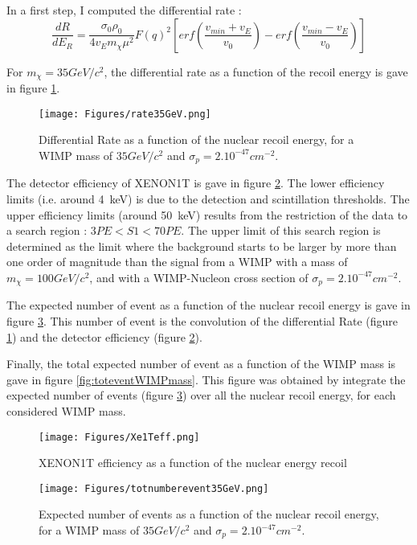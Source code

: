 \documentclass[a4paper, twoside, openany, 11pt]{book}
\begin{document}
In a first step, I computed the differential rate :
\begin{equation}
\frac{dR}{dE_R}= \frac{\sigma_0 \rho_0}{4 v_E m_\chi \mu^2} F(q)^2 \left[erf(\frac{v_{min}+v_E}{v_0})-erf(\frac{v_{min}-v_E}{v_0})\right]
\end{equation}

For $m_\chi = 35 GeV/c^2$, the differential rate as a function of the recoil energy is gave in figure \ref{fig:diffrate35GeV}.

\begin{figure}[h]
	\centering
     \texttt{[image: Figures/rate35GeV.png]}
	\caption{Differential Rate as a function of the nuclear recoil energy, for a WIMP mass of $35 GeV/c^2$ and $\sigma_p =2.10^{-47} cm^{-2}$.}
    \label{fig:diffrate35GeV}
\end{figure}

The detector efficiency of XENON1T is gave in figure \ref{fig:Xe1Teff}. The lower efficiency limits (i.e. around 4~keV) is due to the detection and scintillation thresholds. The upper efficiency limits (around 50~keV) results from the restriction of the data to a search region : $3 PE < S1 < 70 PE$. The upper limit of this search region is determined as the limit where the  background starts to be larger by more than one order of magnitude than the signal from a WIMP with a mass of $m_\chi= 100 GeV/c^2$, and with a WIMP-Nucleon cross section of $\sigma_p = 2.10^{-47} cm^{-2}$.



The expected number of event as a function of the nuclear recoil energy  is gave in figure \ref{fig:totnumberevent35GeV}. This number of event is the convolution of the differential Rate (figure \ref{fig:diffrate35GeV}) and the detector efficiency (figure \ref{fig:Xe1Teff}).


Finally, the total expected number of event as a function of the WIMP mass is gave in figure \ref{fig:toteventWIMPmass}. This figure was obtained by integrate the expected number of events (figure \ref{fig:totnumberevent35GeV}) over all the nuclear recoil energy, for each considered WIMP mass.


\begin{figure}[h]
	\centering
     \texttt{[image: Figures/Xe1Teff.png]}
	\caption{XENON1T efficiency as a function of the nuclear energy recoil}
    \label{fig:Xe1Teff}
\end{figure}


\begin{figure}[h]
	\centering
     \texttt{[image: Figures/totnumberevent35GeV.png]}
	\caption{Expected number of events as a function of the nuclear recoil energy, for a WIMP mass of $35 GeV/c^2$ and $\sigma_p =2.10^{-47} cm^{-2}$.}
    \label{fig:totnumberevent35GeV}
\end{figure}
\end{document}
